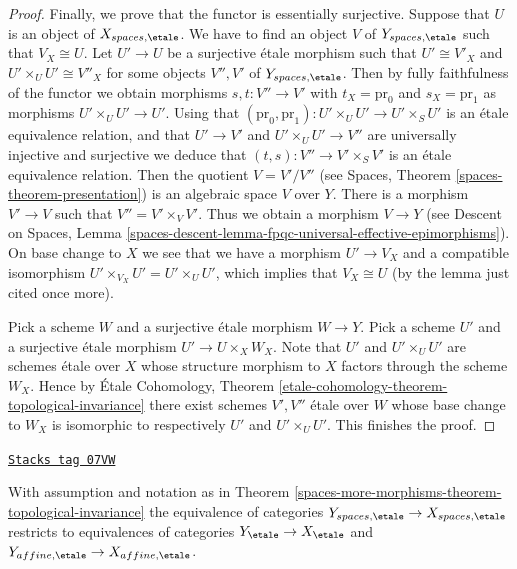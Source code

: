 \begin{proof}
\medskip\noindent
Finally, we prove that the functor is essentially surjective.
Suppose that $U$ is an object of $X_{spaces, \etale}$.
We have to find an object $V$ of $Y_{spaces, \etale}$
such that $V_X \cong U$. Let $U' \to U$ be a surjective \'etale morphism
such that $U' \cong V'_X$ and $U' \times_U U' \cong V''_X$
for some objects $V'', V'$ of $Y_{spaces, \etale}$.
Then by fully faithfulness of the functor we obtain morphisms
$s, t : V'' \to V'$ with $t_X = \text{pr}_0$ and $s_X = \text{pr}_1$
as morphisms $U' \times_U U' \to U'$. Using that
$(\text{pr}_0, \text{pr}_1) : U' \times_U U' \to U' \times_S U'$
is an \'etale equivalence relation, and that $U' \to V'$ and
$U' \times_U U' \to V''$ are universally injective and surjective
we deduce that
$(t, s) : V'' \to V' \times_S V'$ is an \'etale equivalence relation.
Then the quotient $V = V'/V''$ (see
Spaces, Theorem \ref{spaces-theorem-presentation})
is an algebraic space $V$ over $Y$. There is a morphism
$V' \to V$ such that $V'' = V' \times_V V'$. Thus we obtain a morphism
$V \to Y$ (see
Descent on Spaces, Lemma
\ref{spaces-descent-lemma-fpqc-universal-effective-epimorphisms}).
On base change to $X$ we see that we have a morphism $U' \to V_X$
and a compatible isomorphism $U' \times_{V_X} U' = U' \times_U U'$, which
implies that $V_X \cong U$ (by the lemma just cited once more).

\medskip\noindent
Pick a scheme $W$ and a surjective \'etale morphism $W \to Y$.
Pick a scheme $U'$ and a surjective \'etale morphism $U' \to U \times_X W_X$.
Note that $U'$ and $U' \times_U U'$ are schemes \'etale over $X$ whose
structure morphism to $X$ factors through the scheme $W_X$.
Hence by
\'Etale Cohomology,
Theorem \ref{etale-cohomology-theorem-topological-invariance}
there exist schemes $V', V''$ \'etale over $W$ whose base change to
$W_X$ is isomorphic to respectively $U'$ and $U' \times_U U'$.
This finishes the proof.
\end{proof}

\begin{lemma}
\label{spaces-more-morphisms-lemma-topological-invariance}
\href{https://stacks.math.columbia.edu/tag/07VW}{\texttt{Stacks tag 07VW}}

With assumption and notation as in
Theorem \ref{spaces-more-morphisms-theorem-topological-invariance}
the equivalence of categories
$Y_{spaces, \etale} \to X_{spaces, \etale}$
restricts to equivalences of categories
$Y_\etale \to X_\etale$ and $Y_{affine, \etale} \to X_{affine, \etale}$.
\end{lemma}


